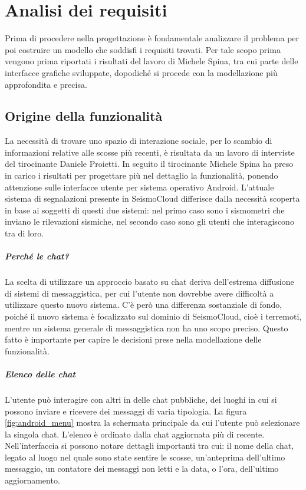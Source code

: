 \chapter{Analisi dei requisiti}
\label{ch:analisi}

Prima di procedere nella progettazione è fondamentale analizzare il problema per poi costruire un modello che soddisfi i requisiti trovati. Per tale scopo prima vengono prima riportati i risultati del lavoro di Michele Spina, tra cui parte delle interfacce grafiche sviluppate, dopodiché si procede con la modellazione più approfondita e precisa.

\section{Origine della funzionalità}

La necessità di trovare uno spazio di interazione sociale, per lo scambio di informazioni relative alle scosse più recenti, è risultata da un lavoro di interviste del tirocinante Daniele Proietti. In seguito il tirocinante Michele Spina ha preso in carico i risultati per progettare più nel dettaglio la funzionalità, ponendo attenzione sulle interfacce utente per sistema operativo Android. L'attuale sistema di segnalazioni presente in SeismoCloud differisce dalla necessità scoperta in base ai soggetti di questi due sistemi: nel primo caso sono i sismometri che inviano le rilevazioni sismiche, nel secondo caso sono gli utenti che interagiscono tra di loro.

\paragraph{Perché le chat?} La scelta di utilizzare un approccio basato su chat deriva dell'estrema diffusione di sistemi di messaggistica, per cui l'utente non dovrebbe avere difficoltà a utilizzare questo nuovo sistema. C'è però una differenza sostanziale di fondo, poiché il nuovo sistema è focalizzato sul dominio di SeismoCloud, cioè i terremoti, mentre un sistema generale di messaggistica non ha uno scopo preciso. Questo fatto è importante per capire le decisioni prese nella modellazione delle funzionalità.

\paragraph{Elenco delle chat} L'utente può interagire con altri in delle chat pubbliche, dei luoghi in cui si possono inviare e ricevere dei messaggi di varia tipologia. La figura \ref{fig:android_menu} mostra la schermata principale da cui l'utente può selezionare la singola chat. L'elenco è ordinato dalla chat aggiornata più di recente. Nell'interfaccia si possono notare dettagli importanti tra cui: il nome della chat, legato al luogo nel quale sono state sentire le scosse, un'anteprima dell'ultimo messaggio, un contatore dei messaggi non letti e la data, o l'ora, dell'ultimo aggiornamento.

